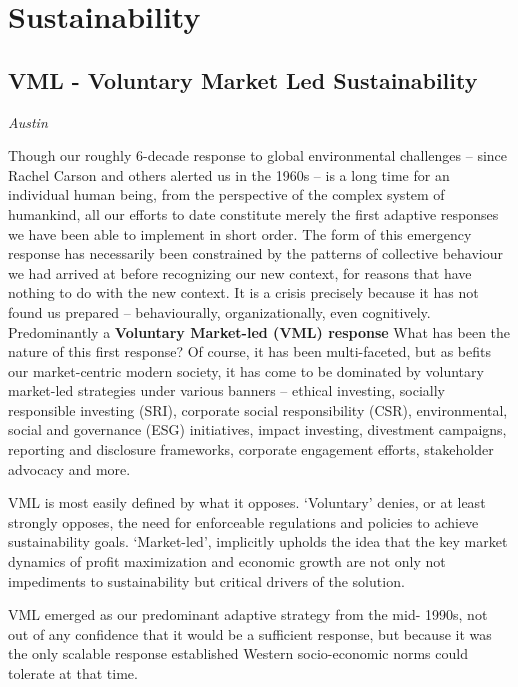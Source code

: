 \documentclass[
]{book}
\begin{document}
\hypertarget{sustainability}{%
\section{Sustainability}\label{sustainability}}

\hypertarget{vml---voluntary-market-led-sustainability}{%
\subsection{VML - Voluntary Market Led Sustainability}\label{vml---voluntary-market-led-sustainability}}

\emph{Austin}

Though our roughly 6-decade response to global environmental challenges -- since
Rachel Carson and others alerted us in the 1960s -- is a long time for an individual human being, from
the perspective of the complex system of humankind, all our efforts to date constitute merely the
first adaptive responses we have been able to implement in short order. The form of this emergency
response has necessarily been constrained by the patterns of collective behaviour we had arrived at
before recognizing our new context, for reasons that have nothing to do with the new context. It is a
crisis precisely because it has not found us prepared -- behaviourally, organizationally, even
cognitively.
Predominantly a \textbf{Voluntary Market-led (VML) response}
What has been the nature of this first response? Of course, it has been multi-faceted, but as befits our
market-centric modern society, it has come to be dominated by voluntary market-led strategies
under various banners -- ethical investing, socially responsible investing (SRI), corporate social
responsibility (CSR), environmental, social and governance (ESG) initiatives, impact investing,
divestment campaigns, reporting and disclosure frameworks, corporate engagement efforts,
stakeholder advocacy and more.

VML is most easily defined by what it opposes. `Voluntary' denies, or at least strongly opposes, the
need for enforceable regulations and policies to achieve sustainability goals. `Market-led', implicitly
upholds the idea that the key market dynamics of profit maximization and economic growth are not
only not impediments to sustainability but critical drivers of the solution.

VML emerged as our predominant adaptive strategy from the mid-
1990s, not out of any confidence that it would be a sufficient response, but because it was the only
scalable response established Western socio-economic norms could tolerate at that time.
\end{document}
